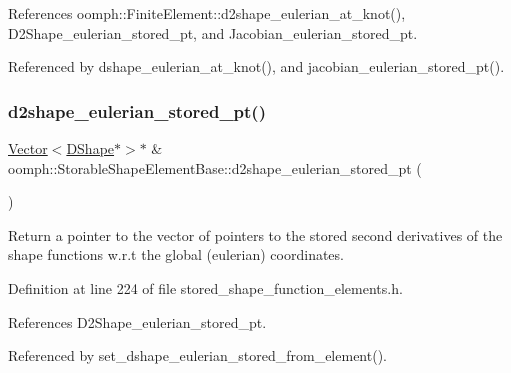 References oomph\+::\+Finite\+Element\+::d2shape\+\_\+eulerian\+\_\+at\+\_\+knot(), D2\+Shape\+\_\+eulerian\+\_\+stored\+\_\+pt, and Jacobian\+\_\+eulerian\+\_\+stored\+\_\+pt.



Referenced by dshape\+\_\+eulerian\+\_\+at\+\_\+knot(), and jacobian\+\_\+eulerian\+\_\+stored\+\_\+pt().

\mbox{\label{classoomph_1_1StorableShapeElementBase_a536372ec41ec0216a79a01d363364712}} 
\subsubsection{\texorpdfstring{d2shape\+\_\+eulerian\+\_\+stored\+\_\+pt()}{d2shape\_eulerian\_stored\_pt()}\hspace{0.1cm}{\footnotesize\ttfamily [1/2]}}
{\footnotesize\ttfamily \hyperlink{classoomph_1_1Vector}{Vector}$<$\hyperlink{classoomph_1_1DShape}{D\+Shape}$\ast$$>$$\ast$ \& oomph\+::\+Storable\+Shape\+Element\+Base\+::d2shape\+\_\+eulerian\+\_\+stored\+\_\+pt (\begin{DoxyParamCaption}{ }\end{DoxyParamCaption})\hspace{0.3cm}{\ttfamily [inline]}}



Return a pointer to the vector of pointers to the stored second derivatives of the shape functions w.\+r.\+t the global (eulerian) coordinates. 



Definition at line 224 of file stored\+\_\+shape\+\_\+function\+\_\+elements.\+h.



References D2\+Shape\+\_\+eulerian\+\_\+stored\+\_\+pt.



Referenced by set\+\_\+dshape\+\_\+eulerian\+\_\+stored\+\_\+from\+\_\+element().

\mbox{\label{classoomph_1_1StorableShapeElementBase_af5d9e3e3c93ea3b6cfd6be4e585044f3}} 
